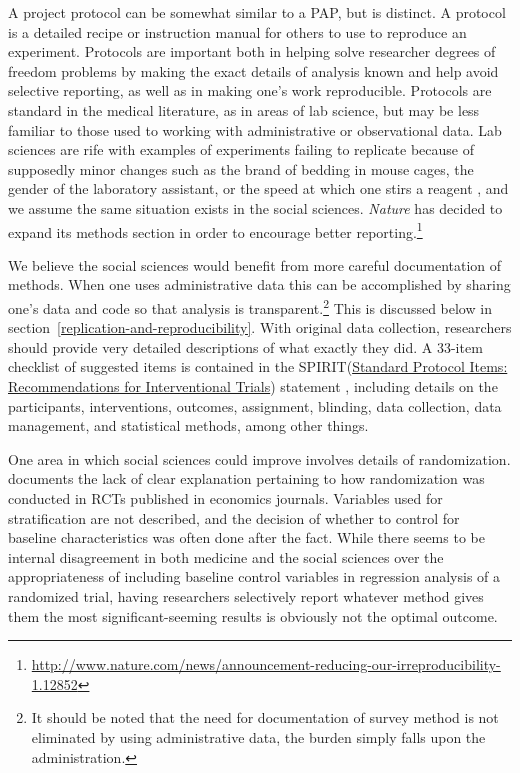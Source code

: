 \documentclass[12pt] {article}
\begin{document}
A project protocol can be somewhat similar to a PAP, but is distinct. A protocol is a detailed recipe or instruction manual for others to use to reproduce an experiment. Protocols are important both in helping solve researcher degrees of freedom problems by making the exact details of analysis known and help avoid selective reporting, as well as in making one's work reproducible. Protocols are standard in the medical literature, as in areas of lab science, but may be less familiar to those used to working with administrative or observational data. Lab sciences are rife with examples of experiments failing to replicate because of supposedly minor changes such as the brand of bedding in mouse cages, the gender of the laboratory assistant, or the speed at which one stirs a reagent \citep{sorge2014olfactory, hines2014sorting}, and we assume the same situation exists in the social sciences. \textit{Nature} has decided to expand its methods section in order to encourage better reporting.\footnote{\url{http://www.nature.com/news/announcement-reducing-our-irreproducibility-1.12852}}

We believe the social sciences would benefit from more careful documentation of methods. When one uses administrative data this can be accomplished by sharing one's data and code so that analysis is transparent.\footnote{It should be noted that the need for documentation of survey method is not eliminated by using administrative data, the burden simply falls upon the administration.} This is discussed below in section~\ref{replication-and-reproducibility}. With original data collection, researchers should provide very detailed descriptions of what exactly they did. A 33-item checklist of suggested items is contained in the SPIRIT(\href{http://www.spirit-statement.org}{Standard Protocol Items: Recommendations for Interventional
Trials}) statement \citep{chan_spirit_2013}, including details on the participants, interventions, outcomes, assignment, blinding, data collection, data management, and statistical methods, among other things. 

One area in which social sciences could improve involves details of randomization. \cite{bruhn_pursuit_2009} documents the lack of clear explanation pertaining to how randomization was conducted in RCTs published in economics journals. Variables used for stratification are not described, and the decision of whether to control for baseline characteristics was often done after the fact. While there seems to be internal disagreement in both
medicine and the social sciences over the appropriateness of including baseline
control variables in regression analysis of a randomized trial, having
researchers selectively report whatever method gives them the most
significant-seeming results is obviously not the optimal outcome. 
\end{document}
